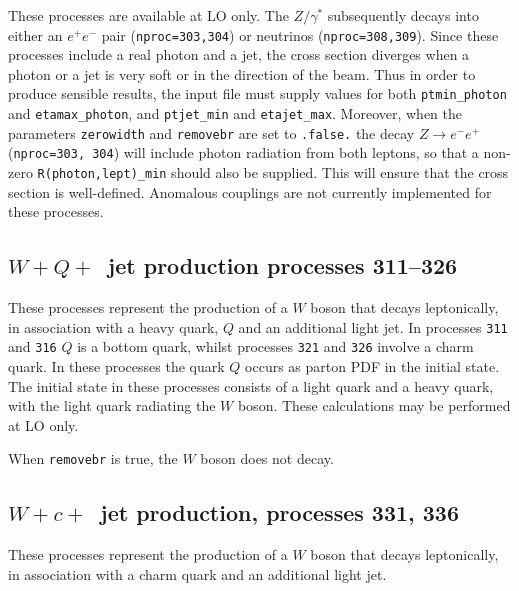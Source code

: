 \documentclass{article}
\begin{document}
{{{{{{These processes are available at LO only. The $Z/\gamma^*$ subsequently decays into 
either an $e^+ e^-$ pair ({\tt nproc=303,304}) or neutrinos ({\tt nproc=308,309}). 
Since these processes include a real photon and a jet, the cross section diverges
when a photon or a jet is very soft or in the direction of the beam.
Thus in order to produce sensible results, the input file must supply values for both
{\tt ptmin\_photon} and {\tt etamax\_photon}, and {\tt ptjet\_min} and {\tt etajet\_max}.
 Moreover, when the parameters {\tt zerowidth}
and {\tt removebr} are set to {\tt .false.} the decay $Z \to e^- e^+$ ({\tt nproc=303, 304})
will include photon radiation from both leptons, so that a non-zero {\tt R(photon,lept)\_min}
should also be supplied. This will ensure that the cross section is well-defined.
Anomalous couplings are not currently implemented for these processes. 




\subsection{$W+Q+$~jet production processes 311--326}
\label{subsec:wQj}

These processes represent the production of a $W$
boson that decays leptonically,
in association with a heavy quark, $Q$ and an additional light jet. In
processes {\tt 311} and {\tt 316} $Q$ is a bottom quark, whilst
processes {\tt 321} and {\tt 326} involve a charm quark.
In these processes the quark $Q$ occurs as parton PDF in the initial state. 
The initial state in these processes consists of a light quark and a heavy 
quark, with the light quark radiating the $W$ boson. These calculations may
be performed at LO only.

When {\tt removebr} is true, the $W$ boson does not decay.

\subsection{$W+c+$~jet production, processes 331, 336}
\label{subsec:wcj}

These processes represent the production of a $W$
boson that decays leptonically,
in association with a charm quark and an additional light jet. 

}}}}}}
\end{document}

